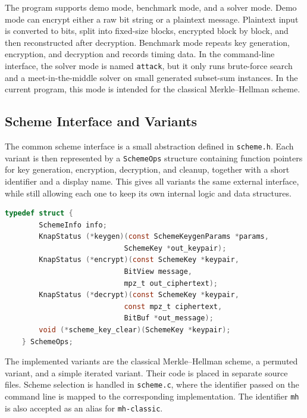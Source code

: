 The program supports demo mode, benchmark mode, and a solver mode.
Demo mode can encrypt either a raw bit string or a plaintext message. Plaintext
input is converted to bits, split into fixed-size blocks, encrypted block by
block, and then reconstructed after decryption. Benchmark mode repeats key
generation, encryption, and decryption and records timing data.
In the command-line interface, the solver mode is named \texttt{attack}, but it
only runs brute-force search and a meet-in-the-middle solver on small generated
subset-sum instances. In the current program, this mode is intended for the
classical Merkle--Hellman scheme.

\subsection{Scheme Interface and Variants}

The common scheme interface is a small abstraction defined in
\texttt{scheme.h}. Each variant is then represented by a \texttt{SchemeOps}
structure containing function pointers for key generation, encryption,
decryption, and cleanup, together with a short identifier and a display name.
This gives all variants the same external interface, while still allowing each
one to keep its own internal logic and data structures. 

\begin{lstlisting}[language=C,caption={Common interface.},label={lst:scheme-ops}]
    typedef struct {
        SchemeInfo info;
        KnapStatus (*keygen)(const SchemeKeygenParams *params,
                            SchemeKey *out_keypair);
        KnapStatus (*encrypt)(const SchemeKey *keypair, 
                            BitView message,
                            mpz_t out_ciphertext);
        KnapStatus (*decrypt)(const SchemeKey *keypair,
                            const mpz_t ciphertext,
                            BitBuf *out_message);
        void (*scheme_key_clear)(SchemeKey *keypair);
    } SchemeOps;
\end{lstlisting}


The implemented variants are the classical Merkle--Hellman scheme, a permuted
variant, and a simple iterated variant. Their code is placed in separate source
files. Scheme selection is handled in \texttt{scheme.c}, where the identifier
passed on the command line is mapped to the corresponding implementation. The
identifier \texttt{mh} is also accepted as an alias for \texttt{mh-classic}.

